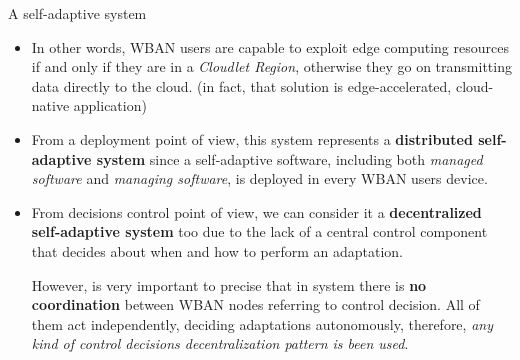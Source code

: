 \documentclass[10pt]{beamer}
\begin{document}
\begin{frame}{A self-adaptive system} 

\begin{itemize}

\item In other words, WBAN users are capable to exploit edge computing resources if and only if they are in a \textit{Cloudlet Region}, otherwise they go on transmitting data directly to the cloud. (in fact, that solution is edge-accelerated, cloud-native application)

\item From a deployment point of view, this system represents a \textbf{distributed self-adaptive system} since a self-adaptive software, including both \textit{managed software} and \textit{managing software}, is deployed in every WBAN users device.\cite{PatternsDecentralizedSelf}

\item From decisions control point of view, we can consider it a \textbf{decentralized self-adaptive system} too due to the lack of a central control component that decides about when and how to perform an adaptation.\cite{PatternsDecentralizedSelf} 

However, is very important to precise that in \citet{MSAReport} system there is \textbf{no coordination} between WBAN nodes referring to control decision. All  of them act independently, deciding adaptations autonomously, therefore, \textit{any kind of control decisions decentralization pattern is been used}. 

\end{itemize}

\end{frame} 
\end{document}
